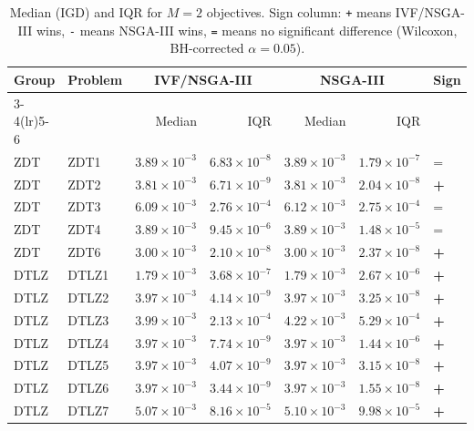 \begin{table}[t]
\centering
\caption{Median (IGD) and IQR for $M=2$ objectives. Sign column: \texttt{+} means IVF/NSGA-III wins, \texttt{-} means NSGA-III wins, \texttt{=} means no significant difference (Wilcoxon, BH-corrected $\alpha=0.05$).}
\label{tab:igd_m2_ivfnsga-iii}
\scriptsize
\begin{tabular}{llrrrrl}
\toprule
Group & Problem & \multicolumn{2}{c}{IVF/NSGA-III} & \multicolumn{2}{c}{NSGA-III} & Sign \\
\cmidrule(lr){3-4}\cmidrule(lr){5-6}
 & & Median & IQR & Median & IQR & \\
\midrule
ZDT & ZDT1 & $3.89\!\times\!10^{-3}$ & $6.83\!\times\!10^{-8}$ & $3.89\!\times\!10^{-3}$ & $1.79\!\times\!10^{-7}$ & = \\
ZDT & ZDT2 & $3.81\!\times\!10^{-3}$ & $6.71\!\times\!10^{-9}$ & $3.81\!\times\!10^{-3}$ & $2.04\!\times\!10^{-8}$ & \textbf{+} \\
ZDT & ZDT3 & $6.09\!\times\!10^{-3}$ & $2.76\!\times\!10^{-4}$ & $6.12\!\times\!10^{-3}$ & $2.75\!\times\!10^{-4}$ & = \\
ZDT & ZDT4 & $3.89\!\times\!10^{-3}$ & $9.45\!\times\!10^{-6}$ & $3.89\!\times\!10^{-3}$ & $1.48\!\times\!10^{-5}$ & = \\
ZDT & ZDT6 & $3.00\!\times\!10^{-3}$ & $2.10\!\times\!10^{-8}$ & $3.00\!\times\!10^{-3}$ & $2.37\!\times\!10^{-8}$ & \textbf{+} \\
\addlinespace
DTLZ & DTLZ1 & $1.79\!\times\!10^{-3}$ & $3.68\!\times\!10^{-7}$ & $1.79\!\times\!10^{-3}$ & $2.67\!\times\!10^{-6}$ & \textbf{+} \\
DTLZ & DTLZ2 & $3.97\!\times\!10^{-3}$ & $4.14\!\times\!10^{-9}$ & $3.97\!\times\!10^{-3}$ & $3.25\!\times\!10^{-8}$ & \textbf{+} \\
DTLZ & DTLZ3 & $3.99\!\times\!10^{-3}$ & $2.13\!\times\!10^{-4}$ & $4.22\!\times\!10^{-3}$ & $5.29\!\times\!10^{-4}$ & \textbf{+} \\
DTLZ & DTLZ4 & $3.97\!\times\!10^{-3}$ & $7.74\!\times\!10^{-9}$ & $3.97\!\times\!10^{-3}$ & $1.44\!\times\!10^{-6}$ & \textbf{+} \\
DTLZ & DTLZ5 & $3.97\!\times\!10^{-3}$ & $4.07\!\times\!10^{-9}$ & $3.97\!\times\!10^{-3}$ & $3.15\!\times\!10^{-8}$ & \textbf{+} \\
DTLZ & DTLZ6 & $3.97\!\times\!10^{-3}$ & $3.44\!\times\!10^{-9}$ & $3.97\!\times\!10^{-3}$ & $1.55\!\times\!10^{-8}$ & \textbf{+} \\
DTLZ & DTLZ7 & $5.07\!\times\!10^{-3}$ & $8.16\!\times\!10^{-5}$ & $5.10\!\times\!10^{-3}$ & $9.98\!\times\!10^{-5}$ & \textbf{+} \\

\end{tabular}
\end{table}
